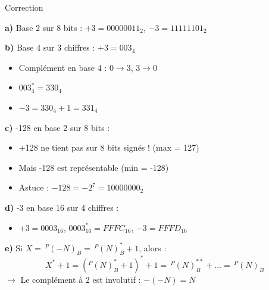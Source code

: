 \documentclass[aspectratio=1610]{beamer}
\begin{document}
\begin{frame}{Correction}

  \textbf{a)} Base 2 sur 8 bits : $+3 = 00000011_2$, $-3 = 11111101_2$

  \textbf{b)} Base 4 sur 3 chiffres : $+3 = 003_4$
  \begin{itemize}
    \item Complément en base 4 : $0 \rightarrow 3$, $3 \rightarrow 0$
    \item $003_4^* = 330_4$
    \item $-3 = 330_4 + 1 = 331_4$
  \end{itemize}

  \textbf{c)} -128 en base 2 sur 8 bits :
  \begin{itemize}
    \item +128 ne tient pas sur 8 bits signés ! (max = 127)
    \item Mais -128 est représentable (min = -128)
    \item Astuce : $-128 = -2^7 = 10000000_2$
  \end{itemize}

  \textbf{d)} -3 en base 16 sur 4 chiffres :
  \begin{itemize}
    \item $+3 = 0003_{16}$, $0003_{16}^* = FFFC_{16}$, $-3 = FFFD_{16}$
  \end{itemize}

  \textbf{e)} Si $X = \,^P(-N)_B = \,^P(N)_B^* + 1$, alors :
  \[
    X^* + 1 = (^P(N)_B^* + 1)^* + 1 = \,^P(N)_B^{**} + \ldots = \,^P(N)_B
  \]
  $\rightarrow$ Le complément à 2 est involutif : $-(-N) = N$ 

\end{frame}
\end{document}
